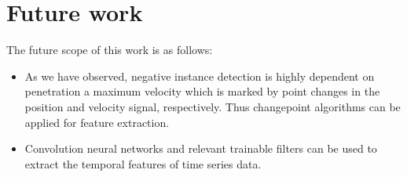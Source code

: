 	\section{Future work}
	The future scope of this work is as follows:
	\begin{itemize}
		\item As we have observed, negative instance detection is highly dependent on penetration a maximum velocity which is marked by point changes in the position and velocity signal, respectively. Thus changepoint algorithms can be applied for feature extraction.
		\item Convolution neural networks and relevant trainable filters can be used to extract the temporal features of time series data. 
		
	\end{itemize}

